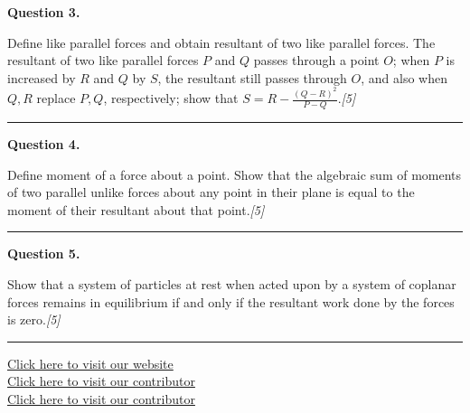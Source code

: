 \documentclass[11pt,a4paper]{article}
\newcommand{\pts}[1]{\hfill   \textit{[#1]}}
\begin{document}
\noindent   \textbf{Question 3.}

\begin{parts}
  \item Define like parallel forces and obtain resultant of two like parallel forces. The resultant of two like parallel forces $P$ and $Q$ passes through a point $O$; when $P$ is increased by $R$ and $Q$ by $S$, the resultant still passes through $O$, and also when $Q, R$ replace $P, Q$, respectively; show that $S = R - \frac{(Q-R)^2}{P-Q}$.\pts{5}
\end{parts}
\medskip\rule{\linewidth}{0.2pt}

\medskip


\noindent   \textbf{Question 4.}

\begin{parts}
  \item Define moment of a force about a point. Show that the algebraic sum of moments of two parallel unlike forces about any point in their plane is equal to the moment of their resultant about that point.\pts{5}
\end{parts}
\medskip\rule{\linewidth}{0.2pt}

\medskip


\noindent   \textbf{Question 5.}

\begin{parts}
  \item Show that a system of particles at rest when acted upon by a system of coplanar forces remains in equilibrium if and only if the resultant work done by the forces is zero.\pts{5}
\end{parts}

\vfill\rule{\linewidth}{0.4pt}

\begin{center}\small
\href{https://bhu-exam.vercel.app/}{Click here to visit our website}\\[4pt]
\href{https://me-aryan.vercel.app/}{Click here to visit our contributor}\\[4pt]
\href{https://quashan-me.vercel.app/}{Click here to visit our contributor}
\end{center}
\end{document}
